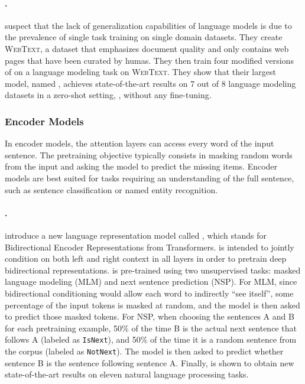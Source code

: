 \paragraph{\gptt.}
\citet{radford2019language} suspect that the lack of generalization capabilities of language models is due to the prevalence of single task training on single domain datasets. They create \textsc{WebText}, a dataset that emphasizes document quality and only contains web pages that have been curated by humas. They then train four modified versions of {\gpt} on a language modeling task on \textsc{WebText}. They show that their largest model, named {\gptt}, achieves state-of-the-art results on 7 out of 8 language modeling datasets in a zero-shot setting, {\ie}, without any fine-tuning.

\subsubsection{Encoder Models}

In encoder models, the attention layers can access every word of the input sentence. The pretraining objective typically consists in masking random words from the input and asking the model to predict the missing items. Encoder models are best suited for tasks requiring an understanding of the full sentence, such as sentence classification or named entity recognition.

\paragraph{\bert.}
\citet{devlin-etal-2019-bert} introduce a new language representation model called {\bert}, which stands for Bidirectional Encoder Representations from Transformers. {\bert} is intended to jointly condition on both left and right context in all layers in order to pretrain deep bidirectional representations. {\bert} is pre-trained using two unsupervised tasks: masked language modeling (MLM) and next sentence prediction (NSP). For MLM, since bidirectional conditioning would allow each word to indirectly “see itself”, some percentage of the input tokens is masked at random, and the model is then asked to predict those masked tokens. For NSP, when choosing the sentences A and B for each pretraining example, 50\% of the time B is the actual next sentence that follows A (labeled as \texttt{IsNext}), and 50\% of the time it is a random sentence from the corpus (labeled as \texttt{NotNext}). The model is then asked to predict whether sentence B is the sentence following sentence A. Finally, {\bert} is shown to obtain new state-of-the-art results on eleven natural language processing tasks.

